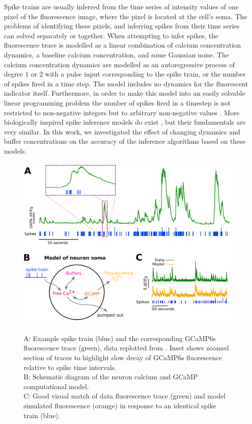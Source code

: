 Spike trains are usually inferred from the time series of intensity values of one pixel of the fluorescence image, where the pixel is located at the cell's soma. The problems of identifying these pixels, and inferring spikes from their time series can solved separately or together. When attempting to infer spikes, the fluorescence trace is modelled as a linear combination of calcium concentration dynamics, a baseline calcium concentration, and some Gaussian noise. The calcium concentration dynamics are modelled as an autoregressive process of degree $1$ or $2$ with a pulse input corresponding to the spike train, or the number of spikes fired in a time step. The model includes no dynamics for the fluorescent indicator itself. Furthermore, in order to make this model into an easily solvable linear programming problem the number of spikes fired in a timestep is not restricted to non-negative integers but to arbitrary non-negative values \parencite{vogelstein, pnevmatikakis, friedrich, paninski1, paninski2}. More biologically inspired spike inference models do exist \parencite{deneux}, but their fundamentals are very similar. In this work, we investigated the effect of changing dynamics and buffer concentrations on the accuracy of the inference algorithms based on these models.

\begin{figure}[p]
    \centering
    \includegraphics[width=\textwidth]{figures/calcium_chapter/Figure1.png}
  \caption{\\ A: Example spike train (blue) and the corresponding GCaMP6s fluorescence trace (green), data replotted from  \parencite{berens}. Inset shows zoomed section of traces to highlight slow decay of GCaMP6s fluorescence relative to spike time intervals.\\
  B: Schematic diagram of the neuron calcium and GCaMP computational model.\\
  C: Good visual match of data fluorescence trace (green) and model simulated fluorescence (orange) in response to an identical spike train (blue).}
  \label{fig:spike_finder_example}
\end{figure}

